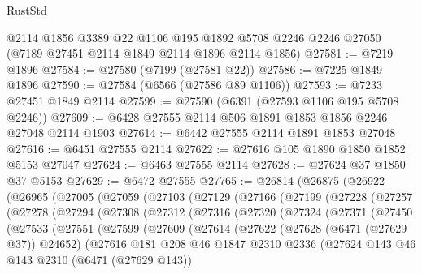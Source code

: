 \begin{lexlean}{RustStd}
\begin{coremodule}
    @2114
    @1856
    @3389
    @22
    @1106
    @195
    @1892
    @5708
    @2246
    @2246
    @27050
    (@7189 @27451 @2114 @1849 @2114 @1896 @2114 @1856)
@27581 := @7219 @1896
@27584 := @27580 (@7199 (@27581 @22))
@27586 := @7225 @1849 @1896
@27590 := @27584 (@6566 (@27586 @89 @1106))
@27593 := @7233 @27451 @1849 @2114
@27599 := @27590 (@6391 (@27593 @1106 @195 @5708 @2246))
@27609 := @6428 @27555 @2114 @506 @1891 @1853 @1856 @2246 @27048 @2114 @1903
@27614 := @6442 @27555 @2114 @1891 @1853 @27048
@27616 := @6451 @27555 @2114
@27622 := @27616 @105 @1890 @1850 @1852 @5153 @27047
@27624 := @6463 @27555 @2114
@27628 := @27624 @37 @1850 @37 @5153
@27629 := @6472 @27555
@27765 := @26814
    (@26875
      (@26922
        (@26965
          (@27005
            (@27059
              (@27103
                (@27129
                  (@27166
                    (@27199
                      (@27228
                        (@27257
                          (@27278
                            (@27294
                              (@27308
                                (@27312
                                  (@27316
                                    (@27320
                                      (@27324
                                        (@27371
                                          (@27450
                                            (@27533
                                              (@27551
                                                (@27599
                                                  (@27609
                                                    (@27614
                                                      (@27622
                                                        (@27628 (@6471 (@27629 @37)) @24652)
                                                        (@27616
                                                          @181
                                                          @208
                                                          @46
                                                          @1847
                                                          @2310
                                                          @2336
                                                          (@27624
                                                            @143
                                                            @46
                                                            @143
                                                            @2310
                                                            (@6471 (@27629 @143))

\end{coremodule}
\end{lexlean}
